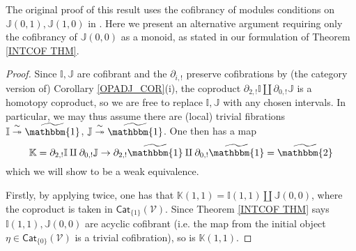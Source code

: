 \documentclass[a4paper,10pt
 ,final
]{article}%
\numberwithin{equation}{section}
\numberwithin{figure}{section}
\theoremstyle{definition} %
\newcommand{\Cat}{\mathsf{Cat}}
\newcommand{\V}{\ensuremath{\mathcal V}}
\newcommand{\1}{\ensuremath{\mathbbm 1}}%
\begin{document}
The original proof of this result \cite[Lemma 1.16]{BM13} uses the cofibrancy of modules conditions on
$\mathbb{J}(0,1),\mathbb{J}(1,0)$
in \cite[Thm 1.15]{BM13}.
Here we present an alternative argument requiring only the cofibrancy of $\mathbb{J}(0,0)$ as a monoid,
as stated in our formulation of Theorem \ref{INTCOF THM}.



\begin{proof}
Since $\mathbb{I},\mathbb{J}$ are cofibrant and the $\partial_{i,!}$
preserve cofibrations by
(the category version of)
Corollary \ref{OPADJ_COR}(i), %
the coproduct 
$\partial_{2,!} \mathbb{I} \amalg \partial_{0,!} \mathbb{J}$
is a homotopy coproduct, 
so we are free to replace $\mathbb{I},\mathbb{J}$
with any chosen intervals.
In particular, we may thus assume there are (local) trivial fibrations
$\mathbb{I} \overset{\sim}{\twoheadrightarrow} \widetilde{\mathbbm{1}}$,
$\mathbb{J} \overset{\sim}{\twoheadrightarrow} \widetilde{\mathbbm{1}}$.
One then has a map
\[
\mathbb{K}=
\partial_{2,!} \mathbb{I} \amalg \partial_{0,!} \mathbb{J}
\to
\partial_{2,!} \widetilde{\mathbbm{1}} \amalg \partial_{0,!} \widetilde{\mathbbm{1}}
= \widetilde{\mathbbm{2}}
\]
which we will show to be a weak equivalence.


Firstly, by applying \cite[Cor. \ref{OC-FGTPUSH_COR}]{BP_FCOP} twice,
one has that $\mathbb{K}(1,1)= \mathbb{I}(1,1) \amalg \mathbb{J}(0,0)$,
where the coproduct is taken in $\Cat_{\{1\}}(\V)$.
Since Theorem \ref{INTCOF THM} says $\mathbb{I}(1,1),\mathbb{J}(0,0)$
are acyclic cofibrant 
(i.e. the map from the initial object 
$\eta \in \mathsf{Cat}_{\{0\}}(\V)$
is a trivial cofibration),
so is $\mathbb{K}(1,1)$.



\end{proof}
\end{document}
